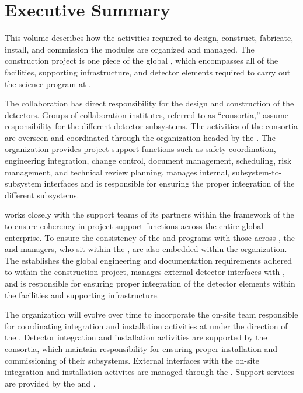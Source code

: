 \chapter{Executive Summary}

\label{vl:tc-execsum}




This volume describes how the activities required to design, construct,
fabricate, install, and commission the   modules 
are organized and managed.  The   construction 
project is one piece of the global , which encompasses 
all of the facilities, supporting infrastructure, and detector elements
required to carry out the  science program at .
      
The  collaboration has direct responsibility for the design 
and construction of the  detectors.  Groups of collaboration 
institutes, referred to as ``consortia,'' assume responsibility for 
the different detector subsystems.  The activities of the consortia are 
overseen and coordinated through the   organization 
headed by the  .  The  organization 
provides project support functions such as safety coordination, 
engineering integration, change control, document management, scheduling, 
risk management, and technical review planning.    
manages internal, subsystem-to-subsystem interfaces and is responsible 
for ensuring the proper integration of the different subsystems.   

  works closely with the support teams of its 
 partners within the framework of the  to 
ensure coherency in project support functions across the entire global 
enterprise.  To ensure the consistency of the   
and  programs with those across , the 
  and  managers, who sit within 
the , are also embedded within the   
organization.  The  establishes the global engineering
and documentation requirements adhered to within the  
 construction project, manages external  detector 
interfaces with , and is responsible for ensuring proper 
integration of the  detector elements within the facilities 
and supporting infrastructure.  

The  organization will evolve over time to incorporate the
on-site team responsible for coordinating integration and installation
activities at  under the direction of the .
Detector integration and installation activities are supported by the
 consortia, which maintain responsibility for ensuring
proper installation and commissioning of their subsystems.  External
 interfaces with the on-site integration and installation
activites are managed through the . Support services are
provided by the  and .

